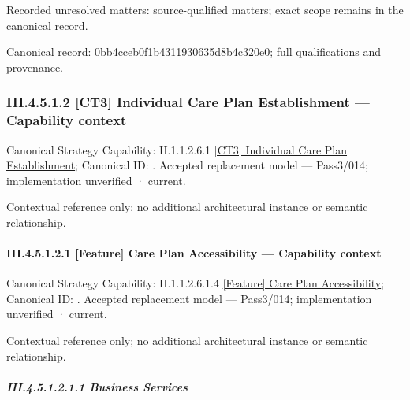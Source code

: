 {\small Recorded unresolved matters: source-qualified matters; exact scope remains in the canonical record.}\par
{\footnotesize \href{../../../../../../../../continuum/business/business-service/0bb4cceb0f1b4311930635d8b4c320e0.md}{Canonical record: 0bb4cceb0f1b4311930635d8b4c320e0}; full qualifications and provenance.}\par
\subsubsection*{III.4.5.1.2 [CT3] Individual Care Plan Establishment — Capability context}
\label{navigation:III.4.5.1.2}

{\small Canonical Strategy Capability: II.1.1.2.6.1 \hyperref[element:03ea71cc13094c62ab6bbc6f51b1fffc]{[CT3] Individual Care Plan Establishment}; Canonical ID: \texttt{}. Accepted replacement model — Pass3/014; implementation unverified · current.}\par
Contextual reference only; no additional architectural instance or semantic relationship.\par
\paragraph*{III.4.5.1.2.1 [Feature] Care Plan Accessibility — Capability context}
\label{navigation:III.4.5.1.2.1}

{\small Canonical Strategy Capability: II.1.1.2.6.1.4 \hyperref[element:ca741f8bbfd246cc9a39ec117b24fa0c]{[Feature] Care Plan Accessibility}; Canonical ID: \texttt{}. Accepted replacement model — Pass3/014; implementation unverified · current.}\par
Contextual reference only; no additional architectural instance or semantic relationship.\par
\subparagraph*{III.4.5.1.2.1.1 Business Services}
\label{navigation:III.4.5.1.2.1.1}

\label{navigation:III.4.5.1.2.1.1.1}

